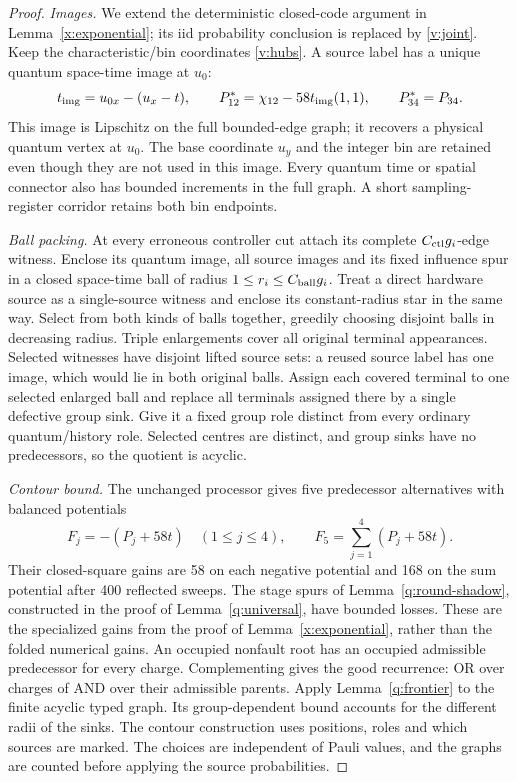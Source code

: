 \begin{proof}
\emph{Images.} We extend the deterministic closed-code argument in
Lemma~\ref{x:exponential}; its iid probability conclusion is replaced
by \eqref{v:joint}. Keep the characteristic/bin coordinates
\eqref{v:hubs}. A source label has a unique quantum space-time image at \(u_0\):
\[
 t_{\rm img}=u_{0x}-(u_x-t),\qquad
 P^*_{12}=\chi_{12}-58t_{\rm img}(1,1),\qquad P^*_{34}=P_{34}.
\]
This image is Lipschitz on the full bounded-edge graph; it recovers a
physical quantum vertex at \(u_0\). The base coordinate \(u_y\) and the
integer bin are retained even though they are not used in this image.
Every quantum time or spatial connector also has bounded increments
in the full graph. A short sampling-register corridor retains both bin endpoints.

\emph{Ball packing.} At every erroneous controller cut attach its complete
\(C_{\rm ctl}g_i\)-edge witness. Enclose its quantum image, all source
images and its fixed influence spur in a closed space-time ball of radius
\(1\le r_i\le C_{\rm ball}g_i\). Treat a direct hardware source as a
single-source witness and enclose its constant-radius star in the same way.
Select from both kinds of balls together, greedily choosing disjoint
balls in decreasing radius. Triple enlargements cover all original
terminal appearances. Selected witnesses have disjoint lifted source sets:
a reused source label has one image, which would lie in both original balls.
Assign each covered terminal to one selected enlarged ball and replace
all terminals assigned there by a single defective group sink. Give it
a fixed group role distinct from every ordinary quantum/history role.
Selected centres are distinct, and group sinks have no predecessors,
so the quotient is acyclic.

\emph{Contour bound.} The unchanged processor gives five predecessor alternatives with
balanced potentials
\[
 F_j=-(P_j+58t)\quad(1\le j\le4),\qquad
 F_5=\sum_{j=1}^4(P_j+58t).
\]
Their closed-square gains are 58 on each negative potential and 168 on the
sum potential after 400 reflected sweeps. The stage spurs of
Lemma~\ref{q:round-shadow}, constructed in the proof of
Lemma~\ref{q:universal}, have bounded losses. These are the specialized gains from the proof of
Lemma~\ref{x:exponential}, rather than the folded numerical gains.
An occupied nonfault root has an occupied admissible predecessor for
every charge. Complementing gives the good recurrence: OR over charges
of AND over their admissible parents. Apply
Lemma~\ref{q:frontier} to the finite acyclic typed graph. Its
group-dependent bound accounts for the different radii of the sinks.
The contour construction uses positions, roles and which sources are marked. The choices are independent of Pauli values, and the graphs are counted before applying the source probabilities.


\end{proof}
